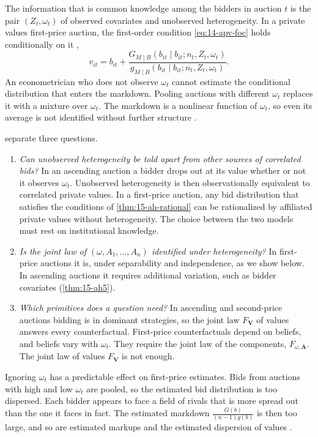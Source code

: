 The information that is common knowledge among the bidders in auction $t$ is the pair
$(Z_t,\omega_t)$ of observed covariates and unobserved heterogeneity. In a private values first-price
auction, the first-order condition \eqref{eq:14-apv-foc} holds conditionally on it
\citep[Section 6.1.2]{AtheyHaile2007},
\begin{equation}\label{eq:15-uh-foc}
v_{it}=b_{it}+\frac{G_{M\mid B}(b_{it}\mid b_{it};n_t,Z_t,\omega_t)}{g_{M\mid B}(b_{it}\mid b_{it};n_t,Z_t,\omega_t)} .
\end{equation}
An econometrician who does not observe $\omega_t$ cannot estimate the conditional distribution that
enters the markdown. Pooling auctions with different $\omega_t$ replaces it with a mixture over
$\omega_t$. The markdown is a nonlinear function of $\omega_t$, so even its average is not identified without further
structure \citep[Section 6.1.2, citing \citealp{HendricksPinksePorter2003}]{AtheyHaile2007}.

\citet[Section 6.1.2]{AtheyHaile2007} separate three questions.
\begin{enumerate}[label=(\roman*)]
\item \emph{Can unobserved heterogeneity be told apart from other sources of correlated bids?} In an
ascending auction a bidder drops out at its value whether or not it observes $\omega_t$. Unobserved
heterogeneity is then observationally equivalent to correlated private values. In a first-price
auction, any bid distribution that satisfies the conditions of \cref{thm:15-ah-rational} can be
rationalized by affiliated private values without heterogeneity. The choice between the two models
must rest on institutional knowledge.
\item \emph{Is the joint law of $(\omega,A_1,\dots,A_n)$ identified under heterogeneity?} In
first-price auctions it is, under separability and independence, as we show below. In ascending
auctions it requires additional variation, such as bidder covariates (\cref{thm:15-ah5}).
\item \emph{Which primitives does a question need?} In ascending and second-price auctions bidding is
in dominant strategies, so the joint law $F_{\bm V}$ of values answers every counterfactual. First-price
counterfactuals depend on beliefs, and beliefs vary with $\omega_t$. They require the joint law of the
components, $F_{\omega,\bm A}$. The joint law of values $F_{\bm V}$ is not enough.
\end{enumerate}

Ignoring $\omega_t$ has a predictable effect on first-price estimates. Bids from auctions with high
and low $\omega_t$ are pooled, so the estimated bid distribution is too dispersed. Each bidder appears
to face a field of rivals that is more spread out than the one it faces in fact. The estimated
markdown $\frac{G(b)}{(n-1)g(b)}$ is then too large, and so are estimated markups and the estimated
dispersion of values \citep[pp.~294--295]{Krasnokutskaya2011}.


